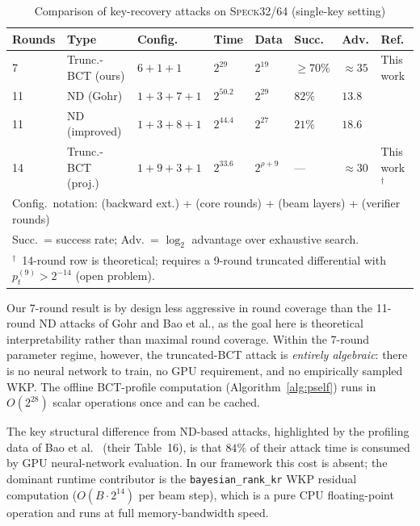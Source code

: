 \documentclass[runningheads]{llncs}
\newcommand{\speck}{\textsc{Speck}32/64}
\begin{document}
\begin{table}[h]
\centering
\caption{Comparison of key-recovery attacks on \speck{}
         (single-key setting)}
\label{tab:comparison}
\setlength{\tabcolsep}{4pt}
\begin{tabular}{llllllll}
\toprule
\textbf{Rounds} & \textbf{Type} & \textbf{Config.}
  & \textbf{Time} & \textbf{Data} & \textbf{Succ.}
  & \textbf{Adv.} & \textbf{Ref.} \\
\midrule
7  & Trunc.-BCT (ours) & $6+1+1$
   & $2^{29}$  & $2^{19}$ & $\geq 70\%$
   & $\approx 35$ & This work \\
11 & ND (Gohr)         & $1+3+7+1$
   & $2^{50.2}$ & $2^{29}$ & $82\%$
   & $13.8$ & \cite{Goh19} \\
11 & ND (improved)     & $1+3+8+1$
   & $2^{44.4}$ & $2^{27}$ & $21\%$
   & $18.6$ & \cite{BLY23} \\
14 & Trunc.-BCT (proj.) & $1+9+3+1$
   & $2^{33.6}$ & $2^{\rho+9}$ & ---
   & $\approx 30$ & This work$^\dagger$ \\
\midrule
\multicolumn{8}{l}{\footnotesize Config.\ notation: (backward ext.) + (core rounds) + (beam layers) + (verifier rounds)} \\
\multicolumn{8}{l}{\footnotesize Succ.\ = success rate; Adv.\ = $\log_2$ advantage over exhaustive search.} \\
\multicolumn{8}{l}{\footnotesize $^\dagger$~14-round row is theoretical; requires a 9-round truncated differential with $p_t^{(9)}>2^{-14}$ (open problem).} \\
\bottomrule
\end{tabular}
\end{table}

Our 7-round result is by design less aggressive in round coverage than
the 11-round ND attacks of Gohr and Bao et al., as the goal here is
theoretical interpretability rather than maximal round coverage.  Within
the 7-round parameter regime, however, the truncated-BCT attack is
\emph{entirely algebraic}: there is no neural network to train, no
GPU requirement, and no empirically sampled WKP.  The offline
BCT-profile computation (Algorithm~\ref{alg:pself}) runs in
$O(2^{28})$ scalar operations once and can be cached.

The key structural difference from ND-based attacks, highlighted by the
profiling data of Bao et al.~\cite{BLY23} (their Table~16), is that
$84\%$ of their attack time is consumed by GPU neural-network evaluation.
In our framework this cost is absent; the dominant runtime contributor
is the \texttt{bayesian\_rank\_kr} WKP residual computation
($O(B \cdot 2^{14})$ per beam step), which is a pure CPU
floating-point operation and runs at full memory-bandwidth speed.
\end{document}
